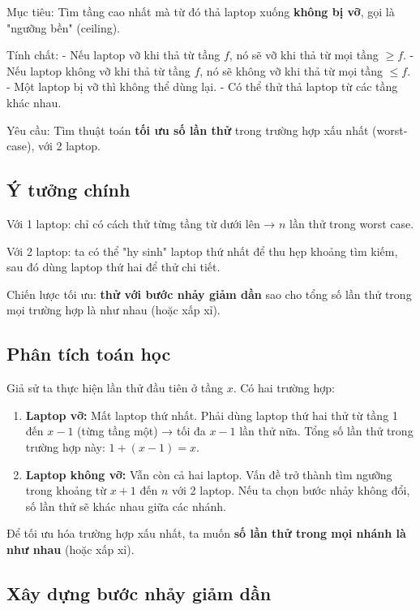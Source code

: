 \documentclass{article}
\begin{document}
Mục tiêu: Tìm tầng cao nhất mà từ đó thả laptop xuống \textbf{không bị vỡ}, gọi là "ngưỡng bền" (ceiling).  

Tính chất:
- Nếu laptop vỡ khi thả từ tầng \(f\), nó sẽ vỡ khi thả từ mọi tầng \(\ge f\).
- Nếu laptop không vỡ khi thả từ tầng \(f\), nó sẽ không vỡ khi thả từ mọi tầng \(\le f\).
- Một laptop bị vỡ thì không thể dùng lại.
- Có thể thử thả laptop từ các tầng khác nhau.

Yêu cầu: Tìm thuật toán \textbf{tối ưu số lần thử} trong trường hợp xấu nhất (worst-case), với 2 laptop.

\subsection{Ý tưởng chính}

Với 1 laptop: chỉ có cách thử từng tầng từ dưới lên → \(n\) lần thử trong worst case.

Với 2 laptop: ta có thể "hy sinh" laptop thứ nhất để thu hẹp khoảng tìm kiếm, sau đó dùng laptop thứ hai để thử chi tiết.

Chiến lược tối ưu: \textbf{thử với bước nhảy giảm dần} sao cho tổng số lần thử trong mọi trường hợp là như nhau (hoặc xấp xỉ).

\subsection{Phân tích toán học}

Giả sử ta thực hiện lần thử đầu tiên ở tầng \(x\). Có hai trường hợp:

\begin{enumerate}
    \item \textbf{Laptop vỡ:} Mất laptop thứ nhất. Phải dùng laptop thứ hai thử từ tầng 1 đến \(x-1\) (từng tầng một) → tối đa \(x-1\) lần thử nữa.  
    Tổng số lần thử trong trường hợp này: \(1 + (x-1) = x\).
    
    \item \textbf{Laptop không vỡ:} Vẫn còn cả hai laptop. Vấn đề trở thành tìm ngưỡng trong khoảng từ \(x+1\) đến \(n\) với 2 laptop.  
    Nếu ta chọn bước nhảy không đổi, số lần thử sẽ khác nhau giữa các nhánh.
\end{enumerate}

Để tối ưu hóa trường hợp xấu nhất, ta muốn \textbf{số lần thử trong mọi nhánh là như nhau} (hoặc xấp xỉ).

\subsection{Xây dựng bước nhảy giảm dần}
\end{document}
